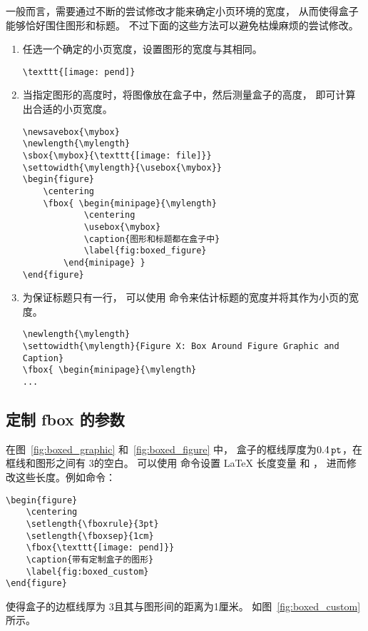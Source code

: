 一般而言，需要通过不断的尝试修改才能来确定小页环境的宽度，
从而使得盒子能够恰好围住图形和标题。
不过下面的这些方法可以避免枯燥麻烦的尝试修改。
\begin{enumerate}
	\item 任选一个确定的小页宽度，设置图形的宽度与其相同。
\begin{lstlisting}
\texttt{[image: pend]}
\end{lstlisting}
	\item 当指定图形的高度时，将图像放在盒子中，然后测量盒子的高度，
	即可计算出合适的小页宽度。
\begin{lstlisting}
\newsavebox{\mybox}
\newlength{\mylength}
\sbox{\mybox}{\texttt{[image: file]}}
\settowidth{\mylength}{\usebox{\mybox}}
\begin{figure}
	\centering
	\fbox{ \begin{minipage}{\mylength}
			\centering
			\usebox{\mybox}
			\caption{图形和标题都在盒子中}
			\label{fig:boxed_figure}
		\end{minipage} }
\end{figure}
\end{lstlisting}

	\item 为保证标题只有一行，
	可以使用  命令来估计标题的宽度并将其作为小页的宽度。
\begin{lstlisting}[xleftmargin=0pt]
\newlength{\mylength} 
\settowidth{\mylength}{Figure X: Box Around Figure Graphic and Caption} 
\fbox{ \begin{minipage}{\mylength} 
...
\end{lstlisting}
\end{enumerate}

\subsection{定制 fbox 的参数} \label{ssec:customizefbox}

在图~\ref{fig:boxed_graphic} 和~\ref{fig:boxed_figure} 中，
盒子的框线厚度为$0.4\,\mathtt{pt}$，在框线和图形之间有 3\pt 的空白。
可以使用  命令设置 \LaTeX{} 长度变量  和 ，
进而修改这些长度。例如命令：
\begin{lstlisting}
\begin{figure}
	\centering
	\setlength{\fboxrule}{3pt}
	\setlength{\fboxsep}{1cm}
	\fbox{\texttt{[image: pend]}}
	\caption{带有定制盒子的图形}
	\label{fig:boxed_custom}
\end{figure}
\end{lstlisting}
使得盒子的边框线厚为 3\pt 且其与图形间的距离为1厘米。
如图~\ref{fig:boxed_custom} 所示。

